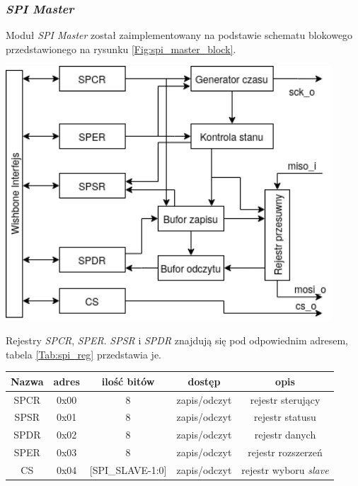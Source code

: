 \documentclass[11pt,a4paper]{article}
\begin{document}
		\subsubsection{\textit{SPI Master}}
		\hspace{5mm} Moduł \textit{SPI Master} został zaimplementowany na podstawie schematu blokowego przedstawionego na rysunku \ref{Fig:spi_master_block}.\\
					\begin{minipage}[c]{\textwidth}

					\includegraphics[width=\textwidth,height=9.5cm]{./rysunki/spi_arch.png}
			\end{minipage} 
		Rejestry \textit{SPCR}, \textit{SPER}. \textit{SPSR} i \textit{SPDR} znajdują się pod odpowiednim adresem, tabela \ref{Tab:spi_reg} przedstawia je.
		\\
 \begin{minipage}{\textwidth}
		 \begin{center}
				\begin{tabular}{|c|c|c|c|c|}
					\hline
					Nazwa & adres & ilość bitów & dostęp & opis \\ 
					\hline
					SPCR & 0x00 & 8 & zapis/odczyt & rejestr sterujący \\
					\hline
					SPSR & 0x01 & 8 &zapis/odczyt & rejestr statusu \\
					\hline
					SPDR & 0x02 & 8 &zapis/odczyt & rejestr danych\\
					\hline
					SPER & 0x03 & 8 &zapis/odczyt & rejestr rozszerzeń\\
					\hline
					CS & 0x04 & [SPI\_SLAVE-1:0] & zapis/odczyt & rejestr wyboru \textit{slave} \\
					\hline
					
				\end{tabular}
		\end{center}
		\end{minipage}	
\end{document}
